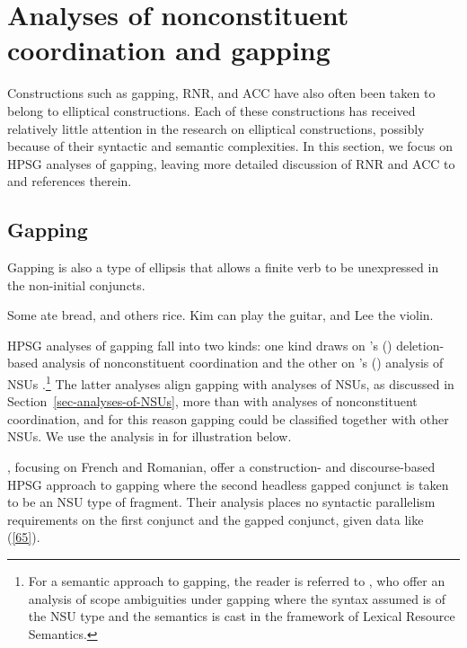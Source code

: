 {\section{Analyses of nonconstituent coordination and gapping}
\label{sec-analyses-of-noncon}

Constructions such as gapping, RNR, and
ACC have also often been taken to belong to elliptical constructions. Each of these constructions has received
relatively little attention in the research on elliptical constructions, possibly
because of their syntactic and semantic complexities. In this
section, we focus on HPSG analyses of gapping, leaving
more detailed discussion of RNR and
ACC to  and references 
therein. 
%
%


\subsection{Gapping}

Gapping is also a type of ellipsis that allows a finite
verb to be unexpressed in the non-initial conjuncts. %

\eal
\label{ex-gapping}
\ex Some ate bread, and others rice.\label{g1}
\ex Kim can play the guitar, and Lee the violin.\label{g2}
\zl
%
%
%
%

HPSG analyses of gapping fall into two kinds: one kind draws on \citeauthor{Beavers2004}'s (\citeyear{Beavers2004}) deletion-based analysis of nonconstituent coordination \citep{Chaves2009} and the other on \citeauthor{Ginzburg:Sag:2000}'s (\citeyear{Ginzburg:Sag:2000}) analysis of NSUs \citep{Abeille2014}.\footnote{For a semantic approach to gapping, the reader is referred to \citet{Parketal2019}, who offer an analysis of scope ambiguities under gapping where the syntax assumed is of the NSU  type and the semantics is cast in the framework of Lexical Resource Semantics.} The latter analyses align gapping with analyses of NSUs, as discussed in Section~\ref{sec-analyses-of-NSUs}, more than with analyses of nonconstituent coordination, and for this reason gapping could be classified together with other NSUs. We use the analysis in \citet{Abeille2014} for illustration below.


\citet{Abeille2014}, focusing on French and Romanian, offer a construction- and
discourse-based HPSG approach to gapping where the second headless gapped conjunct is taken to be an
NSU  type of fragment. Their analysis places no syntactic parallelism requirements on the
first conjunct and the gapped conjunct, given data like (\ref{65}).

}
